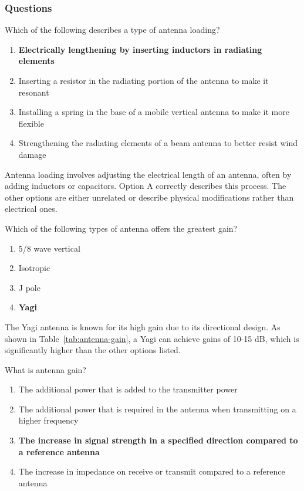 \subsubsection*{Questions}
\begin{tcolorbox}[colback=gray!10!white,colframe=black!75!black,title={T9A02}]
Which of the following describes a type of antenna loading?
\begin{enumerate}[label=\Alph*),noitemsep]
    \item \textbf{Electrically lengthening by inserting inductors in radiating elements}
    \item Inserting a resistor in the radiating portion of the antenna to make it resonant
    \item Installing a spring in the base of a mobile vertical antenna to make it more flexible
    \item Strengthening the radiating elements of a beam antenna to better resist wind damage
\end{enumerate}
\end{tcolorbox}

Antenna loading involves adjusting the electrical length of an antenna, often by adding inductors or capacitors. Option A correctly describes this process. The other options are either unrelated or describe physical modifications rather than electrical ones.

\begin{tcolorbox}[colback=gray!10!white,colframe=black!75!black,title={T9A06}]
Which of the following types of antenna offers the greatest gain?
\begin{enumerate}[label=\Alph*),noitemsep]
    \item 5/8 wave vertical
    \item Isotropic
    \item J pole
    \item \textbf{Yagi}
\end{enumerate}
\end{tcolorbox}

The Yagi antenna is known for its high gain due to its directional design. As shown in Table~\ref{tab:antenna-gain}, a Yagi can achieve gains of 10-15 dB, which is significantly higher than the other options listed.

\begin{tcolorbox}[colback=gray!10!white,colframe=black!75!black,title={T9A11}]
What is antenna gain?
\begin{enumerate}[label=\Alph*),noitemsep]
    \item The additional power that is added to the transmitter power
    \item The additional power that is required in the antenna when transmitting on a higher frequency
    \item \textbf{The increase in signal strength in a specified direction compared to a reference antenna}
    \item The increase in impedance on receive or transmit compared to a reference antenna
\end{enumerate}
\end{tcolorbox}

